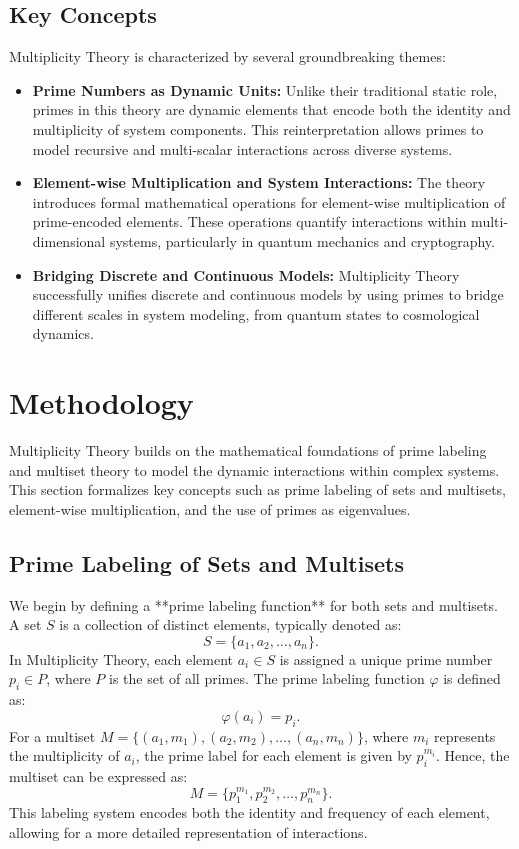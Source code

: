 \documentclass[%
 preprint, linenumbers,
 amsmath,amssymb,
 aps, physrev,
]{revtex4-2}
\begin{document}
\subsection{Key Concepts}

Multiplicity Theory is characterized by several groundbreaking themes:

\begin{itemize} \item \textbf{Prime Numbers as Dynamic Units:} Unlike their traditional static role, primes in this theory are dynamic elements that encode both the identity and multiplicity of system components. This reinterpretation allows primes to model recursive and multi-scalar interactions across diverse systems. \item \textbf{Element-wise Multiplication and System Interactions:} The theory introduces formal mathematical operations for element-wise multiplication of prime-encoded elements. These operations quantify interactions within multi-dimensional systems, particularly in quantum mechanics and cryptography. \item \textbf{Bridging Discrete and Continuous Models:} Multiplicity Theory successfully unifies discrete and continuous models by using primes to bridge different scales in system modeling, from quantum states to cosmological dynamics. \end{itemize}

\section{Methodology}

Multiplicity Theory builds on the mathematical foundations of prime labeling and multiset theory to model the dynamic interactions within complex systems. This section formalizes key concepts such as prime labeling of sets and multisets, element-wise multiplication, and the use of primes as eigenvalues.

\subsection{Prime Labeling of Sets and Multisets}
We begin by defining a **prime labeling function** for both sets and multisets. A set \( S \) is a collection of distinct elements, typically denoted as:
\[
S = \{a_1, a_2, \dots, a_n\}.
\]
In Multiplicity Theory, each element \( a_i \in S \) is assigned a unique prime number \( p_i \in P \), where \( P \) is the set of all primes. The prime labeling function \( \varphi \) is defined as:
\[
\varphi(a_i) = p_i.
\]
For a multiset \( M = \{(a_1, m_1), (a_2, m_2), \dots, (a_n, m_n)\} \), where \( m_i \) represents the multiplicity of \( a_i \), the prime label for each element is given by \( p_i^{m_i} \). Hence, the multiset can be expressed as:
\[
M = \{p_1^{m_1}, p_2^{m_2}, \dots, p_n^{m_n}\}.
\]
This labeling system encodes both the identity and frequency of each element, allowing for a more detailed representation of interactions.
\end{document}

